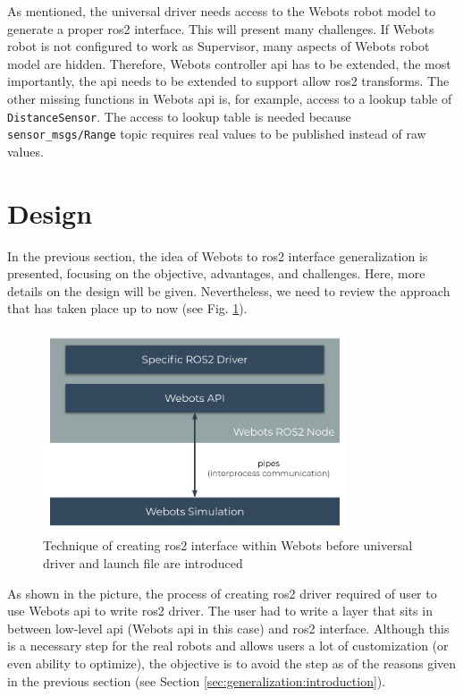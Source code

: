 As mentioned, the universal driver needs access to the Webots robot model to generate a proper \ac{ros2} interface.
This will present many challenges.
If Webots robot is not configured to work as Supervisor, many aspects of Webots robot model are hidden.
Therefore, Webots controller \ac{api} has to be extended, the most importantly, the \ac{api} needs to be extended to support allow \ac{ros2} transforms.
The other missing functions in Webots \ac{api} is, for example, access to a lookup table of \texttt{DistanceSensor}.
The access to lookup table is needed because \texttt{sensor\_msgs/Range} topic requires real values to be published instead of raw values.



\section{Design}

In the previous section, the idea of Webots to \ac{ros2} interface generalization is presented, focusing on the objective, advantages, and challenges.
Here, more details on the design will be given. Nevertheless, we need to review the approach that has taken place up to now (see Fig. \ref{fig:generalization:ros2_driver_within_webots}). 

\begin{figure}[H]
    \centering
    \includegraphics[width=0.8\textwidth]{generalization/figures/ros2_driver_within_webots.pdf}
    \caption{Technique of creating \ac{ros2} interface within Webots before universal driver and launch file are introduced}
    \label{fig:generalization:ros2_driver_within_webots}
\end{figure}

As shown in the picture, the process of creating \ac{ros2} driver required of user to use Webots \ac{api} to write \ac{ros2} driver. 
The user had to write a layer that sits in between low-level \ac{api} (Webots \ac{api} in this case) and \ac{ros2} interface. 
Although this is a necessary step for the real robots and allows users a lot of customization (or even ability to optimize), the objective is to avoid the step as of the reasons given in the previous section (see Section \ref{sec:generalization:introduction}).


